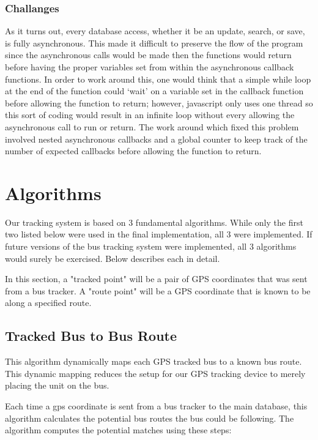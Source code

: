 \documentclass[pageno]{jpaper}
\begin{document}
\subsubsection{Challanges}
As it turns out, every database access, whether it be an update, search, or save, 
is fully asynchronous. This made it difficult to preserve the flow of the program since the 
asynchronous calls would be made then the functions would return before having the 
proper variables set from within the asynchronous callback functions. In order to work 
around this, one would think that a simple while loop at the end of the function 
could ‘wait’ on a variable set in the callback function before allowing the function to 
return; however, javascript only uses one thread so this sort of coding would result in an 
infinite loop without every allowing the asynchronous call to run or return. The work 
around which fixed this problem involved nested asynchronous callbacks and a global 
counter to keep track of the number of expected callbacks before allowing the function 
to return.


\section{Algorithms}

Our tracking system is based on 3 fundamental algorithms.  While only 
the first two listed below were used in the final implementation, all 
3 were implemented.  If future versions of the bus tracking system were 
implemented, all 3 algorithms would surely be exercised.  Below 
describes each in detail.

In this section, a "tracked point" will be a pair of GPS coordinates 
that was sent from a bus tracker.  A "route point" will be a GPS 
coordinate that is known to be along a specified route.

\subsection{Tracked Bus to Bus Route}

This algorithm dynamically maps each GPS tracked bus to a known bus route. 
This dynamic mapping reduces the setup for our GPS tracking device to merely 
placing the unit on the bus.  

Each time a gps coordinate is sent from a bus tracker to the main database, 
this algorithm calculates the potential bus routes the bus could be following. 
The algorithm computes the potential matches using these steps:
\end{document}

